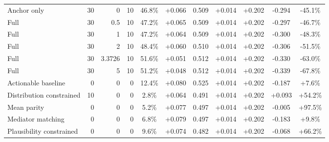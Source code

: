 \begin{table}[htbp]
\begin{tabular}{lrrrccccccc}
Anchor only & 30 & 0 & 10 & 46.8\% & +0.066 & 0.509 & +0.014 & +0.202 & -0.294 & -45.1\% \\
Full & 30 & 0.5 & 10 & 47.2\% & +0.065 & 0.509 & +0.014 & +0.202 & -0.297 & -46.7\% \\
Full & 30 & 1 & 10 & 47.2\% & +0.064 & 0.509 & +0.014 & +0.202 & -0.300 & -48.3\% \\
Full & 30 & 2 & 10 & 48.4\% & +0.060 & 0.510 & +0.014 & +0.202 & -0.306 & -51.5\% \\
Full & 30 & 3.3726 & 10 & 51.6\% & +0.051 & 0.512 & +0.014 & +0.202 & -0.330 & -63.0\% \\
Full & 30 & 5 & 10 & 51.2\% & +0.048 & 0.512 & +0.014 & +0.202 & -0.339 & -67.8\% \\
Actionable baseline & 0 & 0 & 0 & 12.4\% & +0.080 & 0.525 & +0.014 & +0.202 & -0.187 & +7.6\% \\
Distribution constrained & 10 & 0 & 0 & 2.8\% & +0.064 & 0.491 & +0.014 & +0.202 & +0.093 & +54.2\% \\
Mean parity & 0 & 0 & 0 & 5.2\% & +0.077 & 0.497 & +0.014 & +0.202 & -0.005 & +97.5\% \\
Mediator matching & 0 & 0 & 0 & 6.8\% & +0.079 & 0.497 & +0.014 & +0.202 & -0.183 & +9.8\% \\
Plausibility constrained & 0 & 0 & 0 & 9.6\% & +0.074 & 0.482 & +0.014 & +0.202 & -0.068 & +66.2\% \\
\bottomrule
\end{tabular}
\end{table}